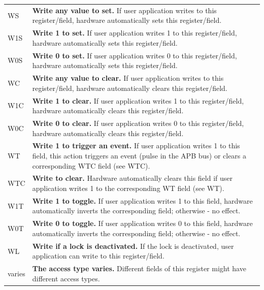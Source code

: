 \begin{longtable}[c]{ R{1cm} p{13cm} }
WS & \textbf{Write any value to set.} 
	If user application writes to this register/field, hardware automatically sets this register/field. \\
W1S & \textbf{Write 1 to set.} 
	If user application writes 1 to this register/field, hardware automatically sets this register/field. \\
W0S & \textbf{Write 0 to set.} 
	If user application writes 0 to this register/field, hardware automatically sets this register/field. \\

WC & \textbf{Write any value to clear.} 
	If user application writes to this register/field, hardware automatically clears this register/field. \\
W1C & \textbf{Write 1 to clear.} 
	If user application writes 1 to this register/field, hardware automatically clears this register/field. \\
W0C & \textbf{Write 0 to clear.} 
	If user application writes 0 to this register/field, hardware automatically clears this register/field. \\

WT & \textbf{Write 1 to trigger an event.} 
	If user application writes 1 to this field, this action triggers an event (pulse in the APB bus) or clears a corresponding WTC field (see WTC). \\
WTC & \textbf{Write to clear.} 
	Hardware automatically clears this field if user application writes 1 to the corresponding WT field (see WT). \\

W1T & \textbf{Write 1 to toggle.} 
	If user application writes 1 to this field, hardware automatically inverts the corresponding field; otherwise - no effect. \\
W0T & \textbf{Write 0 to toggle.} 
	If user application writes 0 to this field, hardware automatically inverts the corresponding field; otherwise - no effect. \\

WL & \textbf{Write if a lock is deactivated.} 
	If the lock is deactivated, user application can write to this register/field. \\

varies & \textbf{The access type varies.} 
	 Different fields of this register might have different access types. \\

\end{longtable}
